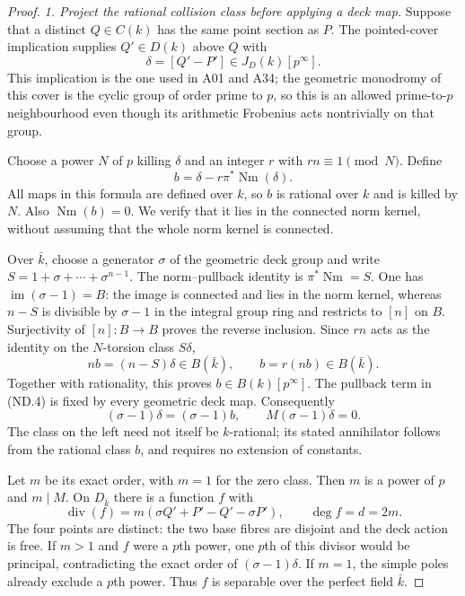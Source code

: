 \documentclass[11pt,a4paper]{article}
\begin{document}
\begin{proof}
\emph{1. Project the rational collision class before applying a deck map.}
Suppose that a distinct $Q\in C(k)$ has the same point section as
$P$. The pointed-cover implication supplies $Q'\in D(k)$ above
$Q$ with
\[
                       \delta=[Q'-P']\in J_D(k)[p^\infty].
 \tag{ND.3}
\]
This implication is the one used in A01 and A34; the geometric
monodromy of this cover is the cyclic group of order prime to $p$, so this is an
allowed prime-to-$p$ neighbourhood even though its arithmetic
Frobenius acts nontrivially on that group.

Choose a power $N$ of $p$ killing $\delta$ and an integer $r$
with $rn\equiv1\pmod N$. Define
\[
                b=\delta-r\pi^*\operatorname{Nm}(\delta).
 \tag{ND.4}
\]
All maps in this formula are defined over $k$, so $b$ is rational
over $k$ and is killed by $N$. Also $\operatorname{Nm}(b)=0$.
We verify that it lies in the connected norm kernel, without
assuming that the whole norm kernel is connected.

Over $\bar k$, choose a generator $\sigma$ of the geometric deck
group and write $S=1+\sigma+\cdots+\sigma^{n-1}$.
The norm--pullback identity is $\pi^*\operatorname{Nm}=S$.
One has $\operatorname{im}(\sigma-1)=B$: the image is connected
and lies in the norm kernel, whereas $n-S$ is divisible by
$\sigma-1$ in the integral group ring and restricts to $[n]$ on
$B$. Surjectivity of $[n]:B\to B$ proves the reverse inclusion.
Since $rn$ acts as the identity on the $N$-torsion class $S\delta$,
\[
             nb=(n-S)\delta\in B(\bar k),\qquad b=r(nb)\in B(\bar k).
 \tag{ND.5}
\]
Together with rationality, this proves $b\in B(k)[p^\infty]$.
The pullback term in (ND.4) is fixed by every geometric deck map.
Consequently
\[
              (\sigma-1)\delta=(\sigma-1)b,
              \qquad M(\sigma-1)\delta=0.
 \tag{ND.6}
\]
The class on the left need not itself be $k$-rational; its stated
annihilator follows from the rational class $b$, and requires no
extension of constants.

Let $m$ be its exact order, with $m=1$ for the zero class. Then
$m$ is a power of $p$ and $m\mid M$. On $D_{\bar k}$ there is a
function $f$ with
\[
 \operatorname{div}(f)
       =m(\sigma Q'+P'-Q'-\sigma P'),\qquad \deg f=d=2m.
 \tag{ND.7}
\]
The four points are distinct: the two base fibres are disjoint
and the deck action is free. If $m>1$ and $f$ were a $p$th power,
one $p$th of this divisor would be principal, contradicting the exact
order of $(\sigma-1)\delta$. If $m=1$, the simple poles already
exclude a $p$th power. Thus $f$ is separable over the perfect field
$\bar k$.


\end{proof}
\end{document}

